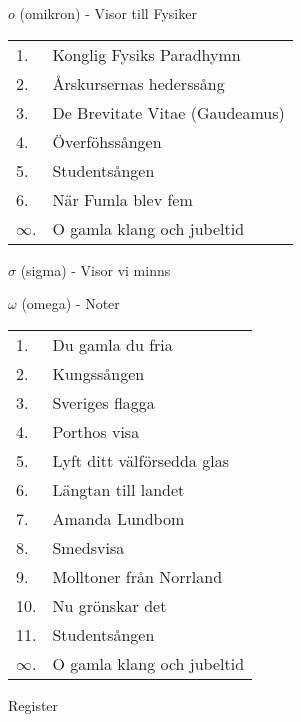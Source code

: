 \documentclass[a6paper,10pt]{article}
\begin{document}
\noindent
\Large $o$ (omikron) - Visor till Fysiker
\vspace{-5pt}
\begin{table}[!h]
\begin{tabularx}{1\textwidth}{l X}
1.&Konglig Fysiks Paradhymn\\
2.&Årskursernas hederssång\\
3.&De Brevitate Vitae (Gaudeamus)\\
4.&Överföhssången\\
5.&Studentsången\\
6.&När Fumla blev fem\\
$\infty$.&O gamla klang och jubeltid
\end{tabularx}
\end{table}

\noindent
\Large $\sigma$ (sigma) - Visor vi minns

\newpage
\noindent
\Large $\omega$ (omega) - Noter
\vspace{-5pt}
\begin{table}[!h]
\begin{tabularx}{1\textwidth}{l X}
1.&Du gamla du fria\\
2.&Kungssången\\
3.&Sveriges flagga\\
4.&Porthos visa\\
5.&Lyft ditt välförsedda glas\\
6.&Längtan till landet\\
7.&Amanda Lundbom\\
8.&Smedsvisa\\
9.&Molltoner från Norrland\\
10.&Nu grönskar det\\
11.&Studentsången\\
$\infty$.&O gamla klang och jubeltid
\end{tabularx}
\end{table}


\noindent
\Large Register
\end{document}
